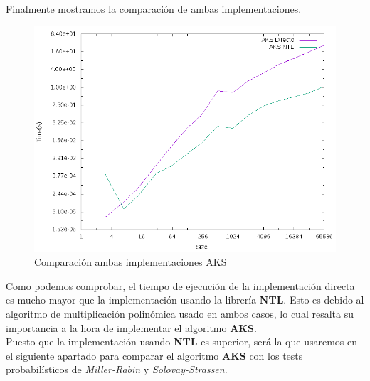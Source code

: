 Finalmente mostramos la comparación de ambas implementaciones.

\begin{figure}[H]
	\centering
	\includegraphics[totalheight=12cm]{img/graphs/aks-mean}
	\caption{Comparación ambas implementaciones AKS}
\end{figure}

Como podemos comprobar, el tiempo de ejecución de la implementación directa es mucho mayor que la implementación usando la librería \textbf{NTL}. Esto es debido al algoritmo de multiplicación polinómica usado en ambos casos, lo cual resalta su importancia a la hora de implementar el algoritmo \textbf{AKS}.\\

Puesto que la implementación usando \textbf{NTL} es superior, será la que usaremos en el siguiente apartado para comparar el algoritmo \textbf{AKS} con los tests probabilísticos de \textit{Miller-Rabin} y \textit{Solovay-Strassen}.

\endinput
